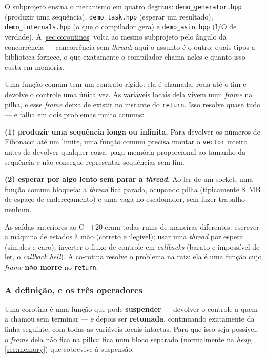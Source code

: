 O subprojeto  ensina o mecanismo em quatro degraus:
\texttt{demo\_generator.hpp} (produzir uma sequência),
\texttt{demo\_task.hpp} (esperar um resultado),
\texttt{demo\_internals.hpp} (o que o compilador gera) e
\texttt{demo\_asio.hpp} (I/O de verdade). A \cref{sec:coroutines} volta ao mesmo
subprojeto pelo ângulo da concorrência --- concorrência sem \emph{thread}; aqui
o assunto é o outro: quais tipos a biblioteca fornece, o que exatamente o
compilador chama neles e quanto isso custa em memória.

\begin{porque}
Uma função comum tem um contrato rígido: ela é chamada, roda até o fim e
devolve o controle uma única vez. As variáveis locais dela vivem num
\emph{frame} na pilha, e esse \emph{frame} deixa de existir no instante do
\texttt{return}. Isso resolve quase tudo --- e falha em dois problemas muito
comuns:

\textbf{(1) produzir uma sequência longa ou infinita.} Para devolver os
números de Fibonacci até um limite, uma função comum precisa montar o
\texttt{vector} inteiro antes de devolver qualquer coisa: paga memória
proporcional ao tamanho da sequência e não consegue representar sequências sem
fim.

\textbf{(2) esperar por algo lento sem parar a \emph{thread}.} Ao ler de um
socket, uma função comum bloqueia: a \emph{thread} fica parada, ocupando pilha
(tipicamente 8~MB de espaço de endereçamento) e uma vaga no escalonador, sem
fazer trabalho nenhum.

As saídas anteriores ao C++20 eram todas ruins de maneiras diferentes: escrever
a máquina de estados à mão (correto e ilegível); usar uma \emph{thread} por
espera (simples e caro); inverter o fluxo de controle em \emph{callbacks}
(barato e impossível de ler, o \emph{callback hell}). A co-rotina resolve o
problema na raiz: ela é uma função cujo \emph{frame} \textbf{não morre} no
\texttt{return}.
\end{porque}

\subsubsection{A definição, e os três operadores}

Uma \gls{corotina} é uma função que pode \textbf{suspender} --- devolver o
controle a quem a chamou sem terminar --- e depois ser \textbf{retomada},
continuando exatamente da linha seguinte, com todas as variáveis locais
intactas. Para que isso seja possível, o \emph{frame} dela não fica na pilha:
fica num bloco separado (normalmente na \emph{heap}, \cref{sec:memory}) que
sobrevive à suspensão.

